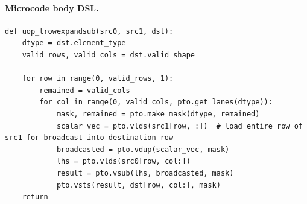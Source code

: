 \paragraph{Microcode body DSL.}
\begin{lstlisting}[style=ptocode]
def uop_trowexpandsub(src0, src1, dst):
    dtype = dst.element_type
    valid_rows, valid_cols = dst.valid_shape

    for row in range(0, valid_rows, 1):
        remained = valid_cols
        for col in range(0, valid_cols, pto.get_lanes(dtype)):
            mask, remained = pto.make_mask(dtype, remained)
            scalar_vec = pto.vlds(src1[row, :])  # load entire row of src1 for broadcast into destination row
            broadcasted = pto.vdup(scalar_vec, mask)
            lhs = pto.vlds(src0[row, col:])
            result = pto.vsub(lhs, broadcasted, mask)
            pto.vsts(result, dst[row, col:], mask)
    return
\end{lstlisting}
\Needspace{0.34\textheight}
